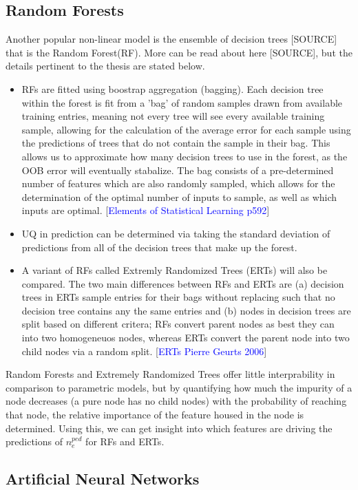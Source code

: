 \documentclass[a4paper, twoside, final, 12pt]{article}
\begin{document}
\subsection{Random Forests}
Another popular non-linear model is the ensemble of decision trees [SOURCE] that is the Random Forest(RF). More can be read about here [SOURCE], but the details pertinent to the thesis are stated below.
\begin{itemize}
	\item RFs are fitted using boostrap aggregation (bagging). Each decision tree within the forest is fit from a 'bag' of random samples drawn from available training entries, meaning not every tree will see every available training sample, allowing for the calculation of the average error for each sample using the predictions of trees that do not contain the sample in their bag. This allows us to approximate how many decision trees to use in the forest, as the OOB error will eventually stabalize. The bag consists of a pre-determined number of features which are also randomly sampled, which allows for the determination of the optimal number of inputs to sample, as well as which inputs are optimal.  [\textcolor{blue}{Elements of Statistical Learning p592}]
	\item UQ in prediction can be determined via taking the standard deviation of predictions from all of the decision trees that make up the forest. 
	\item A variant of RFs called Extremly Randomized Trees (ERTs) will also be compared. The two main differences between RFs and ERTs are (a) decision trees in ERTs sample entries for their bags without replacing such that no decision tree contains any the same entries and (b) nodes in decision trees are split based on different critera; RFs convert parent nodes as best they can into two homogeneuos nodes, whereas ERTs convert the parent node into two child nodes via a random split. [\textcolor{blue}{ERTs Pierre Geurts 2006}]
\end{itemize}

Random Forests and Extremely Randomized Trees offer little interprability in comparison to parametric models, but by quantifying how much the impurity of a node decreases (a pure node has no child nodes) with the probability of reaching that node, the relative importance of the feature housed in the node is determined. Using this, we can get insight into which features are driving the predictions of $n_e^{ped}$ for RFs and ERTs. 

\subsection{Artificial Neural Networks}
\end{document}
